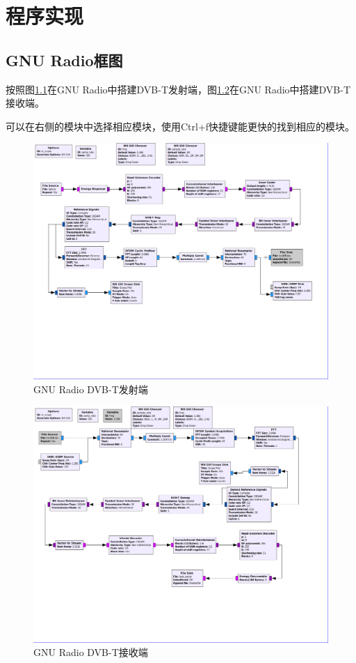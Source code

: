 \chapter{程序实现}
	\section{GNU Radio框图}
		\par 按照图\ref{fig:gnuradio_dvbt_tx}在GNU Radio中搭建DVB-T发射端，图\ref{fig:gnuradio_dvbt_rx}在GNU Radio中搭建DVB-T接收端。
		\par 可以在右侧的模块中选择相应模块，使用Ctrl+f快捷键能更快的找到相应的模块。
		\begin{figure}[htb]
			\centering
			\includegraphics[width=13cm]{figures/dvbt_tx.png}
			\caption{GNU Radio DVB-T发射端}
			\label{fig:gnuradio_dvbt_tx}
		\end{figure}
		\begin{figure}[htb]
			\centering
			\includegraphics[width=13cm]{figures/dvbt_rx.png}
			\caption{GNU Radio DVB-T接收端}
			\label{fig:gnuradio_dvbt_rx}
		\end{figure}
